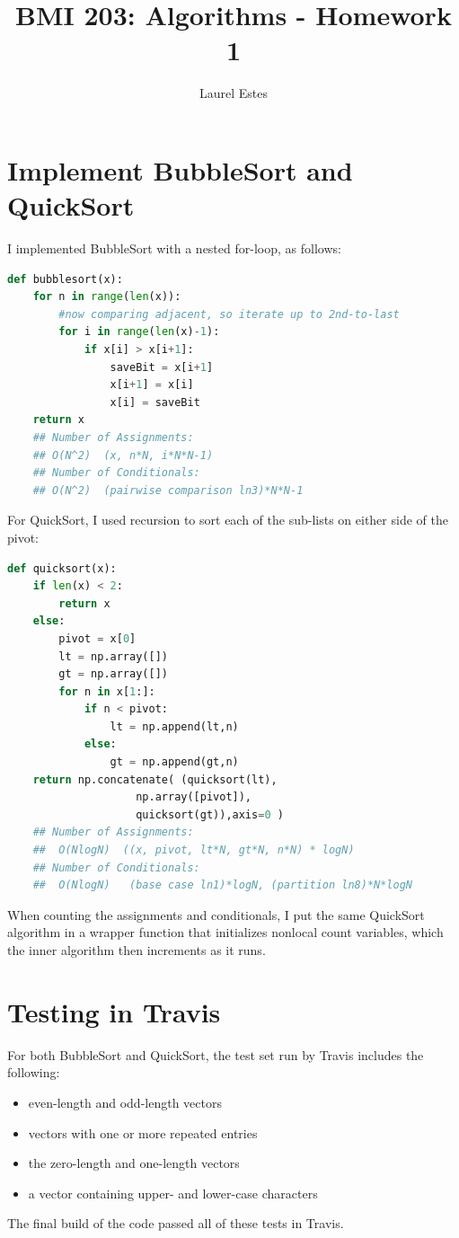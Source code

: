 \documentclass{article}
\begin{document}
\title{BMI 203: Algorithms - Homework 1}
\author{Laurel Estes}
\maketitle
\section{Implement BubbleSort and QuickSort}
I implemented BubbleSort with a nested for-loop, as follows:
\begin{lstlisting}[language=Python]
def bubblesort(x):
    for n in range(len(x)):
    	#now comparing adjacent, so iterate up to 2nd-to-last
        for i in range(len(x)-1): 
            if x[i] > x[i+1]:
                saveBit = x[i+1]
                x[i+1] = x[i]
                x[i] = saveBit
    return x
    ## Number of Assignments:
    ## O(N^2)  (x, n*N, i*N*N-1)
    ## Number of Conditionals:
    ## O(N^2)  (pairwise comparison ln3)*N*N-1
\end{lstlisting}
\vspace{0.5cm}
For QuickSort, I used recursion to sort each of the sub-lists on either side of the pivot:
\begin{lstlisting}[language=python]
def quicksort(x):
    if len(x) < 2:
        return x
    else:
        pivot = x[0]
        lt = np.array([])
        gt = np.array([])
        for n in x[1:]:
            if n < pivot:
                lt = np.append(lt,n)
            else:
                gt = np.append(gt,n)
    return np.concatenate( (quicksort(lt),
    				np.array([pivot]),
    				quicksort(gt)),axis=0 )
    ## Number of Assignments:
    ##  O(NlogN)  ((x, pivot, lt*N, gt*N, n*N) * logN)
    ## Number of Conditionals:
    ##  O(NlogN)   (base case ln1)*logN, (partition ln8)*N*logN
\end{lstlisting}
\vspace{0.5cm}
When counting the assignments and conditionals, I put the same QuickSort algorithm in a wrapper function that initializes nonlocal count variables, which the inner algorithm then increments as it runs.

\section{Testing in Travis}
For both BubbleSort and QuickSort, the test set run by Travis includes the following:
\begin{itemize}
	\item even-length and odd-length vectors
	\item vectors with one or more repeated entries
	\item the zero-length and one-length vectors
	\item a vector containing upper- and lower-case characters
\end{itemize}
The final build of the code passed all of these tests in Travis.
\end{document}
